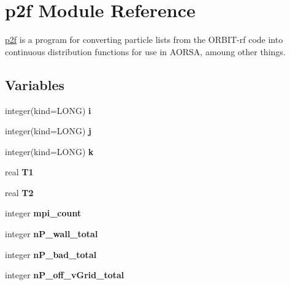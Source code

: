 \hypertarget{namespacep2f}{
\section{p2f Module Reference}
\label{namespacep2f}
}
\hyperlink{namespacep2f}{p2f} is a program for converting particle lists from the ORBIT-rf code into continuous distribution functions for use in AORSA, amoung other things.  


\subsection*{Variables}
\begin{CompactItemize}
\item 
\hypertarget{namespacep2f_be535311321a2f9bcd0c650387db2be5}{
integer(kind=LONG) \textbf{i}}
\label{namespacep2f_be535311321a2f9bcd0c650387db2be5}

\item 
\hypertarget{namespacep2f_f948ee929af97dcba4a35f8a06854ab6}{
integer(kind=LONG) \textbf{j}}
\label{namespacep2f_f948ee929af97dcba4a35f8a06854ab6}

\item 
\hypertarget{namespacep2f_fe7592c2944c061bb449da10f8e12bca}{
integer(kind=LONG) \textbf{k}}
\label{namespacep2f_fe7592c2944c061bb449da10f8e12bca}

\item 
\hypertarget{namespacep2f_c2b19f05a816926c649ddfaebf98bbb5}{
real \textbf{T1}}
\label{namespacep2f_c2b19f05a816926c649ddfaebf98bbb5}

\item 
\hypertarget{namespacep2f_c975b7e2d00f4d0e8328d6275da10d5d}{
real \textbf{T2}}
\label{namespacep2f_c975b7e2d00f4d0e8328d6275da10d5d}

\item 
\hypertarget{namespacep2f_a0eeba5e48d8249420f753c5375dbbde}{
integer \textbf{mpi\_\-count}}
\label{namespacep2f_a0eeba5e48d8249420f753c5375dbbde}

\item 
\hypertarget{namespacep2f_a1d41d0f3043dbde932c3edb705aceeb}{
integer \textbf{nP\_\-wall\_\-total}}
\label{namespacep2f_a1d41d0f3043dbde932c3edb705aceeb}

\item 
\hypertarget{namespacep2f_3238aa3620ec3a700f0ab995cf154804}{
integer \textbf{nP\_\-bad\_\-total}}
\label{namespacep2f_3238aa3620ec3a700f0ab995cf154804}

\item 
\hypertarget{namespacep2f_0e32f4b42454704aad42ca1dc1f52310}{
integer \textbf{nP\_\-off\_\-vGrid\_\-total}}
\label{namespacep2f_0e32f4b42454704aad42ca1dc1f52310}


\end{CompactItemize}
